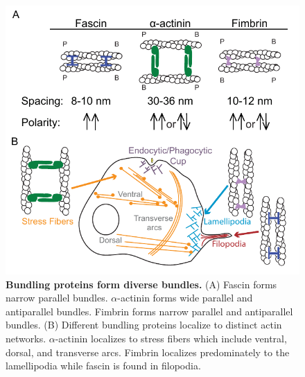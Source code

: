 \begin{figure}
\centering
\includegraphics[width=14cm]{img/ch01/bundlers_thesis.pdf}
\caption[Bundling proteins form diverse bundles.]{\textbf{Bundling proteins form diverse bundles.} (A) Fascin forms narrow parallel bundles. $\alpha$-actinin forms wide parallel and antiparallel bundles. Fimbrin forms narrow parallel and antiparallel bundles. (B) Different bundling proteins localize to distinct actin networks. $\alpha$-actinin localizes to stress fibers which include ventral, dorsal, and transverse arcs. Fimbrin localizes predominately to the lamellipodia while fascin is found in filopodia.}
\label{fig:intro-bundlers}
\end{figure}

